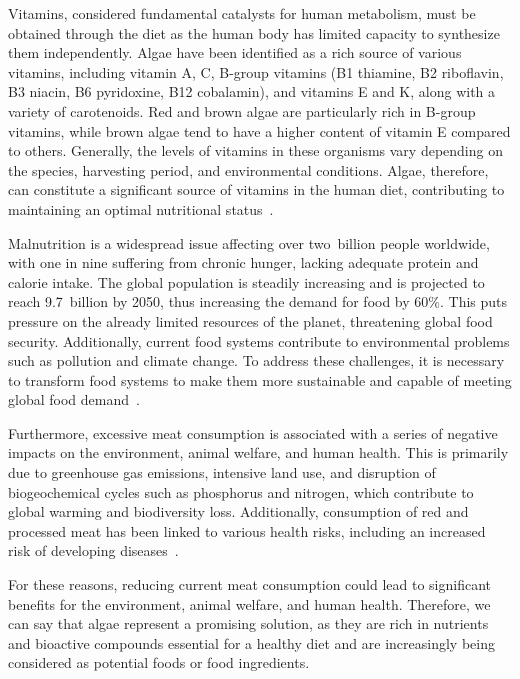 Vitamins, considered fundamental catalysts for human metabolism, must be obtained through the diet as the human body has limited capacity to synthesize them independently. Algae have been identified as a rich source of various vitamins, including vitamin A, C, B-group vitamins (B1 thiamine, B2 riboflavin, B3 niacin, B6 pyridoxine, B12 cobalamin), and vitamins E and K, along with a variety of carotenoids. Red and brown algae are particularly rich in B-group vitamins, while brown algae tend to have a higher content of vitamin E compared to others. Generally, the levels of vitamins in these organisms vary depending on the species, harvesting period, and environmental conditions. Algae, therefore, can constitute a significant source of vitamins in the human diet, contributing to maintaining an optimal nutritional status~\parencite{tiwari_Seaweed_2015}.

Malnutrition is a widespread issue affecting over two~billion people worldwide, with one in nine suffering from chronic hunger, lacking adequate protein and calorie intake. The global population is steadily increasing and is projected to reach \num{9,7}~billion by 2050, thus increasing the demand for food by \num{60}\%. This puts pressure on the already limited resources of the planet, threatening global food security. Additionally, current food systems contribute to environmental problems such as pollution and climate change. To address these challenges, it is necessary to transform food systems to make them more sustainable and capable of meeting global food demand~\parencite{hosseinkhani_Key_2022}.

Furthermore, excessive meat consumption is associated with a series of negative impacts on the environment, animal welfare, and human health. This is primarily due to greenhouse gas emissions, intensive land use, and disruption of biogeochemical cycles such as phosphorus and nitrogen, which contribute to global warming and biodiversity loss. Additionally, consumption of red and processed meat has been linked to various health risks, including an increased risk of developing diseases~\parencite{michel_multinational_2021}.

For these reasons, reducing current meat consumption could lead to significant benefits for the environment, animal welfare, and human health. Therefore, we can say that algae represent a promising solution, as they are rich in nutrients and bioactive compounds essential for a healthy diet and are increasingly being considered as potential foods or food ingredients.
